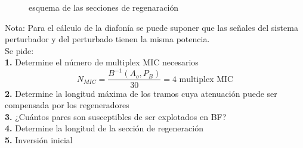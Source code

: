 \begin{exercise}[7]
\begin{figure}[htp]
	\caption{esquema de las secciones de regenaración}
	\end{figure}
	Nota: Para el cálculo de la diafonía se puede suponer que las señales del sistema perturbador y del perturbado tienen la misma potencia.\\
	Se pide:\\
	\textbf{1.} Determine el número de multiplex MIC necesarios\\
	\[N_{MIC}=\frac{B^{-1}(A_o,P_B)}{30}=4\text{ multiplex MIC}\]
	\textbf{2.} Determine la longitud máxima de los tramos cuya atenuación puede ser compensada por los regeneradores\\
	
	\textbf{3.} ¿Cuántos pares son susceptibles de ser explotados en BF?\\
	\textbf{4.} Determine la longitud de la sección de regeneración\\
	\textbf{5.} Inversión inicial
\end{exercise}

